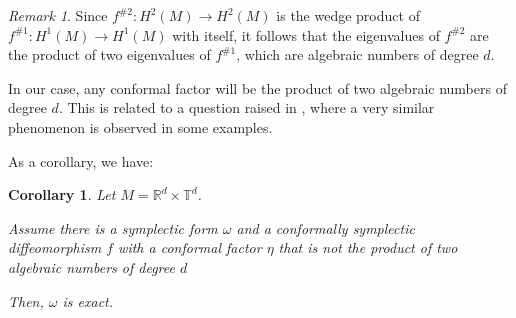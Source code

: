 \documentclass[11pt]{amsart}
\newtheorem{cor}[thm]{Corollary}
\theoremstyle{definition}
\theoremstyle{remark}
\newtheorem{rem}[thm]{Remark}
\numberwithin{equation}{section}
\newcommand{\R}{\mathbb R}
\def\torus{{\mathbb T}}
\begin{document}
\begin{rem}
Since $f^{\#2}:H^2(M)\rightarrow H^2(M)$ is the wedge product of $f^{\#1}: H^1(M) \rightarrow H^1(M)$
with itself, it follows that the eigenvalues of $f^{\#2}$
are the product of two eigenvalues of $f^{\#1}$,
which are algebraic numbers of degree $d$.

In our case,  any conformal factor will be
the product of two algebraic numbers of degree $d$.
This is related to a question raised in \cite[p. 165]{ArnaudF24},
where a very similar  phenomenon is observed in some examples.
\end{rem}

As a corollary, we have:
\begin{cor}
  Let  $M = \R^d \times \torus^d$.

  Assume there is a symplectic form $\omega$ and a conformally
  symplectic diffeomorphism $f$ with a conformal factor $\eta$ that is not
  the product of two algebraic numbers of degree $d$

  Then, $\omega$ is exact.
\end{cor}
\end{document}
